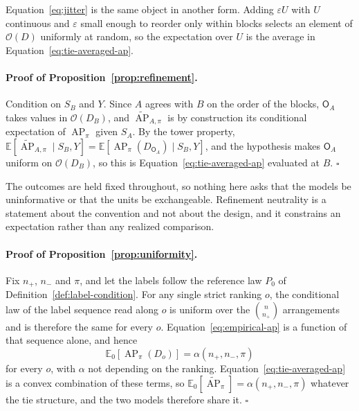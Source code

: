 \documentclass[11pt]{article}
\newcommand{\AP}{\operatorname{AP}}
\newcommand{\E}{\mathbb{E}}
\newcommand{\APta}{\widetilde{\AP}}
\newcommand{\Rank}{\mathsf{O}}
\theoremstyle{remark}
\begin{document}
Equation~\eqref{eq:jitter} is the same object in another form. Adding $\varepsilon U$ with $U$ continuous and $\varepsilon$ small enough to reorder only within blocks selects an element of $\mathcal{O}(D)$ uniformly at random, so the expectation over $U$ is the average in Equation~\eqref{eq:tie-averaged-ap}.

\paragraph{Proof of Proposition~\ref{prop:refinement}.}
Condition on $S_B$ and $Y$. Since $A$ agrees with $B$ on the order of the blocks, $\Rank_A$ takes values in $\mathcal{O}(D_B)$, and $\APta_{A,\pi}$ is by construction its conditional expectation of $\AP_\pi$ given $S_A$. By the tower property, $\E[\APta_{A,\pi}\mid S_B,Y]=\E[\AP_\pi(D_{\Rank_A})\mid S_B,Y]$, and the hypothesis makes $\Rank_A$ uniform on $\mathcal{O}(D_B)$, so this is Equation~\eqref{eq:tie-averaged-ap} evaluated at $B$. $\square$

The outcomes are held fixed throughout, so nothing here asks that the models be uninformative or that the units be exchangeable. Refinement neutrality is a statement about the convention and not about the design, and it constrains an expectation rather than any realized comparison.

\paragraph{Proof of Proposition~\ref{prop:uniformity}.}
Fix $n_+$, $n_-$ and $\pi$, and let the labels follow the reference law $P_0$ of Definition~\ref{def:label-condition}. For any single strict ranking $o$, the conditional law of the label sequence read along $o$ is uniform over the $\binom{n}{n_+}$ arrangements and is therefore the same for every $o$. Equation~\eqref{eq:empirical-ap} is a function of that sequence alone, and hence
\[
\E_0\left[\AP_\pi(D_o)\right]
=
\alpha(n_+,n_-,\pi)
\]
for every $o$, with $\alpha$ not depending on the ranking. Equation~\eqref{eq:tie-averaged-ap} is a convex combination of these terms, so $\E_0[\APta_\pi]=\alpha(n_+,n_-,\pi)$ whatever the tie structure, and the two models therefore share it. $\square$
\end{document}
